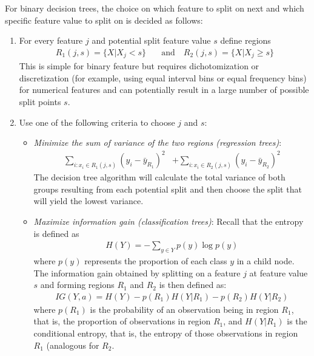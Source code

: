 \begin{advanced}
For binary decision trees, the choice on which feature to split on next and which specific feature value to split on is decided as follows:
\begin{enumerate}
   \item For every feature $j$ and potential split feature value $s$ define regions
   \begin{align*}
   R_1(j,s) = \{X | X_j < s\} \quad &\text{and} \quad R_2(j, s) = \{X | X_j \geq s\}
   \end{align*}
   This is simple for binary feature but requires dichotomization or discretization (for example, using equal interval bins or equal frequency bins) for numerical features and can potentially result in a large number of possible split points $s$.
   \item Use one of the following criteria to choose $j$ and $s$:
   \begin{itemize}
      \item \emph{Minimize the sum of variance of the two regions (regression trees)}:
      \begin{align*}
       \sum_{i: x_i \in R_1(j,s)} (y_i - \bar{y}_{R_1})^2 &+ \sum_{i: x_i \in R_2(j,s)} (y_i - \bar{y}_{R_2})^2
       \end{align*}
       The decision tree algorithm will calculate the total variance of both groups resulting from each potential split and then choose the split that will yield the lowest variance.
      \item \emph{Maximize information gain (classification trees)}:
      Recall that the entropy is defined as 
	  \begin{align*}
	   H(Y) = - \sum_{y \in Y} p(y) \log p(y)
	   \end{align*}
       where $p(y)$ represents the proportion of each class $y$ in a child node. The information gain obtained by splitting on a feature $j$ at feature value $s$ and forming regions $R_1$ and $R_2$ is then defined as:
	   \begin{align*}
	   IG(Y, a) = H(Y) - p(R_1) H(Y | R_1) - p( R_2) H(Y | R_2) 
	   \end{align*}
       where $p(R_1)$ is the probability of an observation being in region $R_1$, that is, the proportion of observations in region $R_1$, and $H(Y | R_1)$ is the conditional entropy, that is, the entropy of those observations in region $R_1$ (analogous for $R_2$. 
       

\end{itemize}
\end{enumerate}
\end{advanced}
